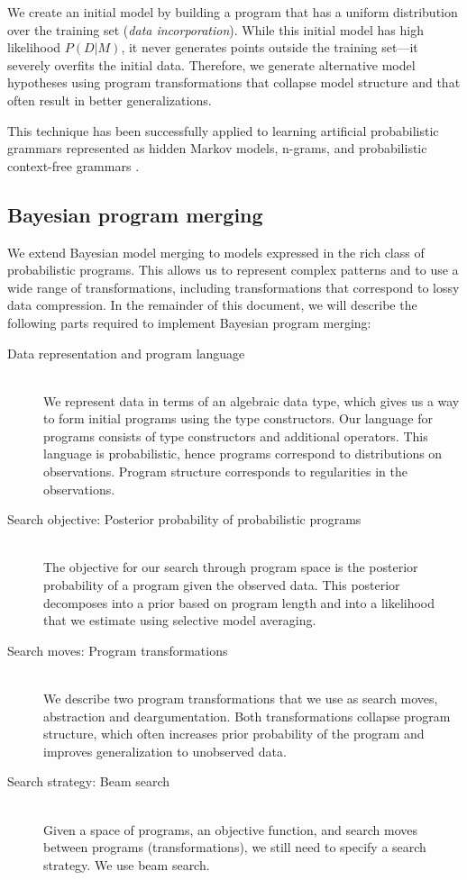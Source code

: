 \documentclass[a4paper,10pt]{article}
\begin{document}
We create an initial model by building a program that has a uniform distribution over the training set ({\em data incorporation}).  While this initial model has high likelihood $P(D|M)$, it never generates points outside the training set---it severely overfits the initial data. Therefore, we generate alternative model hypotheses using program transformations that collapse model structure and that often result in better generalizations.

This technique has been successfully applied to learning artificial probabilistic grammars represented as hidden Markov models, n-grams, and probabilistic context-free grammars \cite{Stolcke:1994:IPG:645515.658235}.


\subsection{Bayesian program merging}

We extend Bayesian model merging to models expressed in the rich class of probabilistic programs.  This allows us to represent complex patterns and to use a wide range of transformations, including transformations that correspond to lossy data compression. In the remainder of this document, we will describe the following parts required to implement Bayesian program merging:

\begin{description}
\item[Data representation and program language]  \hfill \\
  We represent data in terms of an algebraic data type, which gives us a way to form initial programs using the type constructors. Our language for programs consists of type constructors and additional operators. This language is probabilistic, hence programs correspond to distributions on observations. Program structure corresponds to regularities in the observations.
\item[Search objective: Posterior probability of probabilistic programs]  \hfill \\
  The objective for our search through program space is the posterior probability of a program given the observed data. This posterior decomposes into a prior based on program length and into a likelihood that we estimate using selective model averaging.
\item[Search moves: Program transformations]  \hfill \\
  We describe two program transformations that we use as search moves, abstraction and deargumentation. Both transformations collapse program structure, which often increases prior probability of the program and improves generalization to unobserved data.
  \item[Search strategy: Beam search]  \hfill \\
  Given a space of programs, an objective function, and search moves between programs (transformations), we still need to specify a search strategy. We use beam search.
\end{description}
\end{document}
